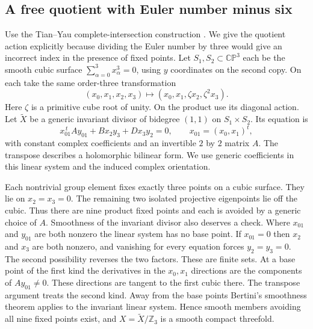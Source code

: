 \documentclass[aps,prd,reprint,onecolumn,nofootinbib,amsmath,amssymb]{revtex4-2}
\begin{document}
\subsection{A free quotient with Euler number minus six}
Use the Tian--Yau complete-intersection construction \cite{TianYau1987}. We give the quotient action explicitly because dividing the Euler number by three would give an incorrect index in the presence of fixed points. Let $S_1,S_2\subset\mathbb{CP}^3$ each be the smooth cubic surface $\sum_{\alpha=0}^3x_\alpha^3=0$, using $y$ coordinates on the second copy. On each take the same order-three transformation
\begin{equation}
 (x_0,x_1,x_2,x_3)\longmapsto
 (x_0,x_1,\zeta x_2,\zeta^2 x_3).
\end{equation}
Here $\zeta$ is a primitive cube root of unity. On the product use its diagonal action. Let $\widetilde X$ be a generic invariant divisor of bidegree $(1,1)$ on $S_1\times S_2$. Its equation is
\begin{equation}
 x_{01}^{\,t} A y_{01}+B x_2y_3+D x_3y_2=0,
 \qquad x_{01}=(x_0,x_1)^t ,
 \label{eq:divisor}
\end{equation}
with constant complex coefficients and an invertible $2$ by $2$ matrix $A$. The transpose describes a holomorphic bilinear form. We use generic coefficients in this linear system and the induced complex orientation.

Each nontrivial group element fixes exactly three points on a cubic surface. They lie on $x_2=x_3=0$. The remaining two isolated projective eigenpoints lie off the cubic. Thus there are nine product fixed points and each is avoided by a generic choice of $A$. Smoothness of the invariant divisor also deserves a check. Where $x_{01}$ and $y_{01}$ are both nonzero the linear system has no base point. If $x_{01}=0$ then $x_2$ and $x_3$ are both nonzero, and vanishing for every equation forces $y_2=y_3=0$. The second possibility reverses the two factors. These are finite sets. At a base point of the first kind the derivatives in the $x_0,x_1$ directions are the components of $A y_{01}\ne0$. These directions are tangent to the first cubic there. The transpose argument treats the second kind. Away from the base points Bertini's smoothness theorem applies to the invariant linear system. Hence smooth members avoiding all nine fixed points exist, and $X=\widetilde X/\mathbb Z_3$ is a smooth compact threefold.
\end{document}
